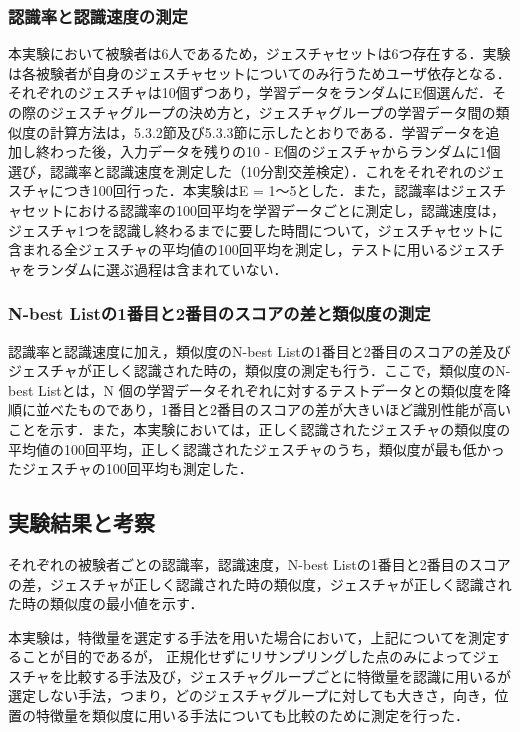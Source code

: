 \subsubsection{認識率と認識速度の測定}
本実験において被験者は6人であるため，ジェスチャセットは6つ存在する．実験は各被験者が自身のジェスチャセットについてのみ行うためユーザ依存となる．それぞれのジェスチャは10個ずつあり，学習データをランダムにE個選んだ．その際のジェスチャグループの決め方と，ジェスチャグループの学習データ間の類似度の計算方法は，5.3.2節及び5.3.3節に示したとおりである．学習データを追加し終わった後，入力データを残りの10 - E個のジェスチャからランダムに1個選び，認識率と認識速度を測定した（10分割交差検定）．これをそれぞれのジェスチャにつき100回行った．本実験はE = 1〜5とした．また，認識率はジェスチャセットにおける認識率の100回平均を学習データごとに測定し，認識速度は，ジェスチャ1つを認識し終わるまでに要した時間について，ジェスチャセットに含まれる全ジェスチャの平均値の100回平均を測定し，テストに用いるジェスチャをランダムに選ぶ過程は含まれていない．

\subsubsection{N-best Listの1番目と2番目のスコアの差と類似度の測定}
認識率と認識速度に加え，類似度のN-best Listの1番目と2番目のスコアの差及びジェスチャが正しく認識された時の，類似度の測定も行う．ここで，類似度のN-best Listとは，N 個の学習データそれぞれに対するテストデータとの類似度を降順に並べたものであり，1番目と2番目のスコアの差が大きいほど識別性能が高いことを示す．また，本実験においては，正しく認識されたジェスチャの類似度の平均値の100回平均，正しく認識されたジェスチャのうち，類似度が最も低かったジェスチャの100回平均も測定した．


\subsection{実験結果と考察}
それぞれの被験者ごとの認識率，認識速度，N-best Listの1番目と2番目のスコアの差，ジェスチャが正しく認識された時の類似度，ジェスチャが正しく認識された時の類似度の最小値を示す．

本実験は，特徴量を選定する手法を用いた場合において，上記についてを測定することが目的であるが，
正規化せずにリサンプリングした点のみによってジェスチャを比較する手法及び，ジェスチャグループごとに特徴量を認識に用いるが選定しない手法，つまり，どのジェスチャグループに対しても大きさ，向き，位置の特徴量を類似度に用いる手法についても比較のために測定を行った．

